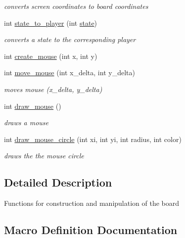 \begin{DoxyCompactItemize}
\begin{DoxyCompactList}\small\item\em converts screen coordinates to board coordinates \end{DoxyCompactList}\item 
int \hyperlink{group___checkers_gad7f7feb83c536c88d67834e7e20780ee}{state\+\_\+to\+\_\+player} (int \hyperlink{checkers_8c_a89f234133d3efe315836311cbf21c64b}{state})
\begin{DoxyCompactList}\small\item\em converts a state to the corresponding player \end{DoxyCompactList}\item 
int \hyperlink{group___checkers_ga258c52e2e4a6ef24d9fb5ec06bedaa53}{create\+\_\+mouse} (int x, int y)
\item 
int \hyperlink{group___checkers_ga597f43aacf586aacf3c32664944f8ba9}{move\+\_\+mouse} (int x\+\_\+delta, int y\+\_\+delta)
\begin{DoxyCompactList}\small\item\em moves mouse (x\+\_\+delta, y\+\_\+delta) \end{DoxyCompactList}\item 
int \hyperlink{group___checkers_ga0f9d87b0bea416d794ed80855026d550}{draw\+\_\+mouse} ()
\begin{DoxyCompactList}\small\item\em draws a mouse \end{DoxyCompactList}\item 
int \hyperlink{group___checkers_ga0580c6365cfa09e2d8a30d3d47f3adb1}{draw\+\_\+mouse\+\_\+circle} (int xi, int yi, int radius, int color)
\begin{DoxyCompactList}\small\item\em draws the the mouse circle \end{DoxyCompactList}\end{DoxyCompactItemize}


\subsection{Detailed Description}
Functions for construction and manipulation of the board 

\subsection{Macro Definition Documentation}
\hypertarget{group___checkers_ga84d1df2a2deef34e0e9f8d4375b5b8f6}{}\label{group___checkers_ga84d1df2a2deef34e0e9f8d4375b5b8f6} 
